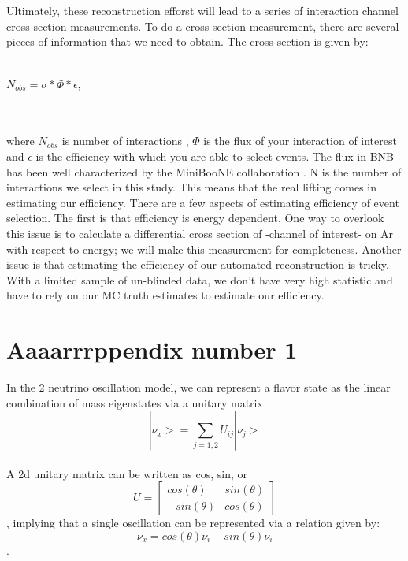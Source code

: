\documentclass[12pt]{article}
\begin{document}
\\ \\Ultimately, these reconstruction efforst will lead to a series of interaction channel cross section measurements.  To do a cross section measurement, there are several pieces of information that we need to obtain. The cross section is given by:
\\ \\ \centerline{ $N_{obs} = \sigma * \Phi * \epsilon$, }	
\\ \\ where $N_{obs}$ is number of interactions , $\Phi$ is the flux of your interaction of interest and $\epsilon$ is the efficiency with which you are able to select events.  
The flux in BNB has been well characterized by the MiniBooNE collaboration \cite{miniboone}. N is the number of interactions we select in this study.  This means that the real lifting comes in estimating our efficiency. There are a few aspects of estimating efficiency of event selection.  The first is that efficiency is energy dependent.  One way to overlook this issue is to calculate a differential cross section of -channel of interest- on Ar with respect to energy; we will make this measurement for completeness.  Another issue is that estimating the efficiency of our automated reconstruction is tricky.  With a limited sample of un-blinded data, we don't have very high statistic and have to rely on our MC truth estimates to estimate our efficiency.     

\appendix
\section{Aaaarrrppendix number 1}
In the 2 neutrino oscillation model, we can represent a flavor state as the linear combination of mass eigenstates via a unitary matrix
\begin{equation}
|\nu_x> = \sum_{j=1,2} U_{ij} |\nu_j>  
\end{equation}
\\ A 2d unitary matrix can be written as cos, sin, or
\begin{equation}
U = \begin{bmatrix}
cos(\theta) & sin(\theta)
\\ -sin(\theta)& cos(\theta)
\end{bmatrix}
\end{equation},
implying that a single oscillation can be represented via a relation given by:
\begin{equation}
\nu_x = cos(\theta)\nu_i + sin(\theta)\nu_i 
\end{equation}.
\end{document}
